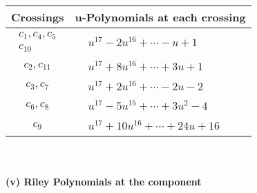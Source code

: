 \documentclass[1p]{elsarticle_modified}
\theoremstyle{definition}
\begin{document}
\begin{tabular}{m{50pt}|m{274pt}}
Crossings & \hspace{64pt}u-Polynomials at each crossing \\
\hline $$\begin{aligned}c_{1},c_{4},c_{5}\\c_{10}\end{aligned}$$&$\begin{aligned}
&u^{17}-2 u^{16}+\cdots- u+1
\end{aligned}$\\
\hline $$\begin{aligned}c_{2},c_{11}\end{aligned}$$&$\begin{aligned}
&u^{17}+8 u^{16}+\cdots+3 u+1
\end{aligned}$\\
\hline $$\begin{aligned}c_{3},c_{7}\end{aligned}$$&$\begin{aligned}
&u^{17}+2 u^{16}+\cdots-2 u-2
\end{aligned}$\\
\hline $$\begin{aligned}c_{6},c_{8}\end{aligned}$$&$\begin{aligned}
&u^{17}-5 u^{15}+\cdots+3 u^2-4
\end{aligned}$\\
\hline $$\begin{aligned}c_{9}\end{aligned}$$&$\begin{aligned}
&u^{17}+10 u^{16}+\cdots+24 u+16
\end{aligned}$\\
\hline
\end{tabular}\\~\\
\newpage\renewcommand{\arraystretch}{1}
\flushleft \textbf{(v) Riley Polynomials at the component}\newline \\
\end{document}
